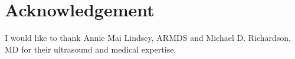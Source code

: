 \section{Acknowledgement}

I would like to thank Annie Mai Lindsey, ARMDS and Michael D. Richardson, MD for their ultrasound and medical expertise.